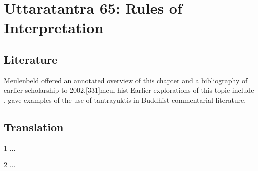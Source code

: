 
\chapter{Uttaratantra 65:  Rules of Interpretation}

\section{Literature} 

Meulenbeld offered an annotated overview of this chapter and a bibliography
of earlier scholarship to 2002.[331]{meul-hist}  Earlier explorations 
of this topic include \cite{dasg-1952,
    lele-1981,
    mejo-2000,
    nara-1949,
    ober-1967,
    scha-1993,
    sing-2003,
    muth-1976}. 
\cite{mane-2008} gave examples of the use of tantrayuktis in Buddhist 
commentarial literature.

\section{Translation}

\begin{translation}
    
    \item [1] ...
    
    \item [2] ...
    
\end{translation}
